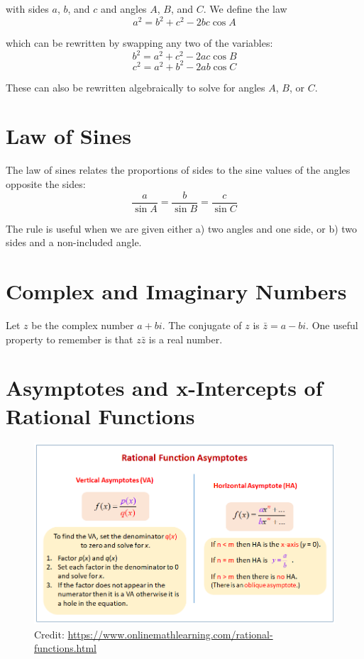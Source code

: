 \documentclass[12pt]{article}
\begin{document}
with sides \(a\), \(b\), and \(c\) and angles \(A\), \(B\), and \(C\). We define the law\\

\[a^2=b^2+c^2-2bc\cos A\]

which can be rewritten by swapping any two of the variables:\\

\[b^2=a^2+c^2-2ac\cos B\]
\[c^2=a^2+b^2-2ab\cos C\]

These can also be rewritten algebraically to solve for angles \(A\), \(B\), or \(C\).

\section{Law of Sines}

The law of sines relates the proportions of sides to the sine values of the angles opposite the sides:\\

\[\frac{a}{\sin A}=\frac{b}{\sin B}=\frac{c}{\sin C}\]

The rule is useful when we are given either a) two angles and one side, or b) two sides and a non-included angle.\\

\section{Complex and Imaginary Numbers}

Let \(z\) be the complex number \(a+bi\). The conjugate of \(z\) is \(\bar{z}=a-bi\). One useful property to remember is that \(z\bar{z}\) is a real number.

\section{Asymptotes and x-Intercepts of Rational Functions}

\begin{figure}[H]
	\centering
	\includegraphics[scale=.75]{rational.png}
	\caption{Credit: \url{https://www.onlinemathlearning.com/rational-functions.html}}
\end{figure}
\end{document}
